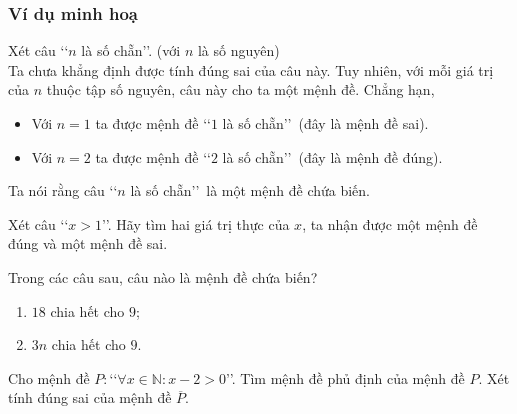 \subsubsection{Ví dụ minh hoạ}

\begin{vd}%
	Xét câu \lq \lq $n$ là số chẵn\rq \rq. (với $n$ là số nguyên) \\
	Ta chưa khẳng định được tính đúng sai của câu này. Tuy nhiên, với mỗi giá trị của $n$ thuộc tập số nguyên, câu này cho ta một mệnh đề.
	Chẳng hạn,
	\begin{itemize}
		\item Với $n=1$ ta được mệnh đề \lq \lq $1$ là số chẵn\rq \rq\, (đây là mệnh đề sai).
		\item Với $n=2$ ta được mệnh đề \lq \lq $2$ là số chẵn\rq \rq\, (đây là mệnh đề đúng).
	\end{itemize}
	Ta nói rằng câu \lq \lq $n$ là số chẵn\rq \rq\, là một mệnh đề chứa biến.	
\end{vd}
\begin{vd}%
	Xét câu \lq\lq$x>1$\rq\rq. Hãy tìm hai giá trị thực của $x$, ta nhận được một mệnh đề đúng và một mệnh đề sai.
\end{vd}
\begin{vd}%
	Trong các câu sau, câu nào là mệnh đề chứa biến?
	\begin{enumerate}
		\item $18$ chia hết cho $9$;
		\item $3n$ chia hết cho $9$.
	\end{enumerate}
\end{vd}
\begin{vd}%
	Cho mệnh đề $P\colon$\lq\lq $\forall x \in \mathbb{N}: x-2>0$\rq\rq. Tìm mệnh đề phủ định của mệnh đề $P$. Xét tính đúng sai của mệnh đề $\overline{P}$.
\end{vd}
